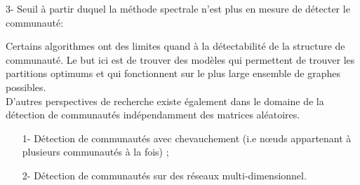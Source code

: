 \par{3- Seuil à partir duquel la méthode spectrale n'est plus en mesure de détecter le communauté: } 

Certains algorithmes ont des limites quand à la détectabilité de la structure de communauté. 
Le but ici est de trouver des modèles qui permettent de trouver les partitions optimums et qui fonctionnent sur le plus large ensemble de graphes possibles.\\

D'autres perspectives de recherche existe également dans le domaine de la détection de communautés indépendamment des matrices aléatoires.
\begin{itemize}
	\item[1-] Détection de communautés avec chevauchement (i.e nœuds appartenant à plusieurs communautés à la fois) ;
	\item[2-] Détection de communautés sur des réseaux multi-dimensionnel.
\end{itemize}